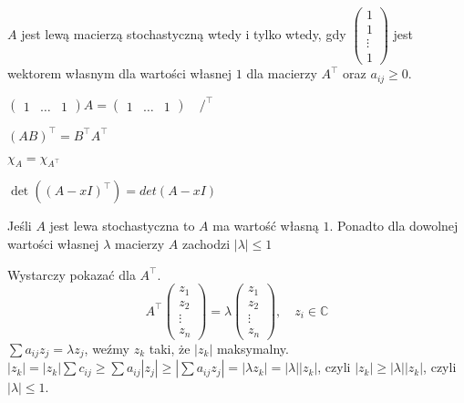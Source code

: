 \begin{ft} 
    $A$ jest lewą macierzą stochastyczną wtedy i tylko wtedy, gdy 
    $\begin{pmatrix} 1 \\ 1 \\ \vdots \\ 1 \end{pmatrix}$
    jest wektorem własnym dla wartości własnej $1$ dla macierzy $A^\top$ oraz $a_{ij} \ge 0$.
\end{ft} 
\begin{dd} 
    $\begin{pmatrix} 1 & \ldots & 1 \end{pmatrix} A = \begin{pmatrix} 1 & \ldots & 1 \end{pmatrix} \quad /^\top$
\end{dd} 
\begin{ft} $(AB)^\top = B^\top A^\top$ \end{ft} 
\begin{ft} $\chi_A = \chi_{A^\top}$ \end{ft} 
\begin{dd} $\det ((A-xI)^\top) = det(A-xI)$ \end{dd} 
\begin{wn} Jeśli $A$ jest lewa stochastyczna to $A$ ma wartość własną $1$. Ponadto dla dowolnej wartości własnej 
    $\lambda$ macierzy $A$ zachodzi $|\lambda| \le 1$ \end{wn}
\begin{dd} 
    Wystarczy pokazać dla $A^\top$. 
    \[ A^\top \begin{pmatrix} z_1 \\ z_2 \\ \vdots \\ z_n \end{pmatrix} = 
    \lambda \begin{pmatrix} z_1 \\ z_2 \\ \vdots \\ z_n \end{pmatrix}, \quad z_i \in \mathbb C\]
    $ \sum a_{ij} z_j = \lambda z_j $, weźmy $z_k$ taki, że $|z_k|$ maksymalny. \\ 
    $|z_k| = |z_k| \sum c_{ij} \ge \sum a_{ij} |z_j| \ge | \sum a_{ij} z_j| = |\lambda z_k| = |\lambda| |z_k|$, 
    czyli $|z_k| \ge |\lambda| |z_k|$, czyli $|\lambda| \le 1$.
\end{dd} 
